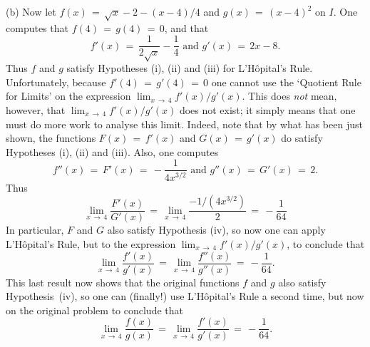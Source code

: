 {        (b) Now let $f(x) \,=\, \sqrt{x}-2-(x-4)/4$ and $g(x) \,=\, (x-4)^{2}$ on $I$.
     One computes that $f(4) \,=\, g(4) \,=\, 0$, and that
        \begin{displaymath}
        f'(x) \,=\, \frac{1}{2\sqrt{x}} - \frac{1}{4} \mbox{ and }
        g'(x) \,=\, 2x-8.
        \end{displaymath}
    Thus $f$ and $g$ satisfy Hypotheses (i), (ii) and (iii) for L'H\^{o}pital's Rule.
    Unfortunately, because $f'(4) \,=\, g'(4) \,=\, 0$ one cannot use the `Quotient Rule for Limits' on the expression $\lim_{x \,{\rightarrow}\, 4} f'(x)/g'(x)$.
    This does {\em not} mean, however, that $\lim_{x \,{\rightarrow}\, 4} f'(x)/g'(x)$ does not exist;
    it simply means that one must do more work to analyse this limit.
    Indeed, note that by what has been just shown, the functions $F(x) \,=\, f'(x)$ and $G(x) \,=\, g'(x)$ do satisfy Hypotheses (i), (ii) and (iii).
    Also, one computes
        \begin{displaymath}
        f''(x) \,=\, F'(x) \,=\, -\frac{1}{4x^{3/2}} \mbox{ and } g''(x) \,=\, G'(x) \,=\, 2.
        \end{displaymath}
    Thus
        \begin{displaymath}
        \lim_{x \,{\rightarrow}\, 4} \frac{F'(x)}{G'(x)} \,=\, 
        \lim_{x \,{\rightarrow}\, 4} \frac{-1/(4x^{3/2})}{2} \,=\, -\frac{1}{64}
        \end{displaymath}
    In particular, $F$ and $G$ also satisfy Hypothesis (iv), so now one can apply L'H\^{o}pital's Rule,
    but to the expression $\lim_{x \,{\rightarrow}\, 4} f'(x)/g'(x)$, to conclude that
        \begin{displaymath}
        \lim_{x \,{\rightarrow}\, 4} \frac{f'(x)}{g'(x)} \,=\, \lim_{x \,{\rightarrow}\, 4} \frac{f''(x)}{g''(x)} \,=\, -\frac{1}{64}.
        \end{displaymath}
    This last result now shows that the original functions $f$ and $g$ also satisfy Hypothesis~(iv),
    so one can (finally!) use L'H\^{o}pital's Rule a second time, but now on the original problem to conclude that
        \begin{displaymath}
        \lim_{x \,{\rightarrow}\, 4} \frac{f(x)}{g(x)} \,=\, \lim_{x \,{\rightarrow}\, 4} \frac{f'(x)}{g'(x)} \,=\, -\frac{1}{64}.
        \end{displaymath}

\V

}
